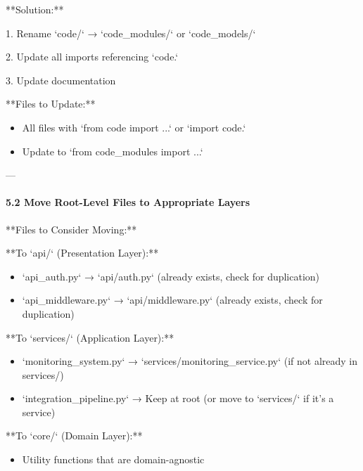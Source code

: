 \documentclass[11pt,a4paper]{article}
\begin{document}
**Solution:**

1. Rename `code/` → `code\_modules/` or `code\_models/`

2. Update all imports referencing `code.`

3. Update documentation

**Files to Update:**

\begin{itemize}
\item All files with `from code import ...` or `import code.`
\end{itemize}

\begin{itemize}
\item Update to `from code_modules import ...`
\end{itemize}

---

\paragraph{5.2 Move Root-Level Files to Appropriate Layers}

**Files to Consider Moving:**

**To `api/` (Presentation Layer):**

\begin{itemize}
\item `api_auth.py` → `api/auth.py` (already exists, check for duplication)
\end{itemize}

\begin{itemize}
\item `api_middleware.py` → `api/middleware.py` (already exists, check for duplication)
\end{itemize}

**To `services/` (Application Layer):**

\begin{itemize}
\item `monitoring_system.py` → `services/monitoring_service.py` (if not already in services/)
\end{itemize}

\begin{itemize}
\item `integration_pipeline.py` → Keep at root (or move to `services/` if it's a service)
\end{itemize}

**To `core/` (Domain Layer):**

\begin{itemize}
\item Utility functions that are domain-agnostic
\end{itemize}
\end{document}
